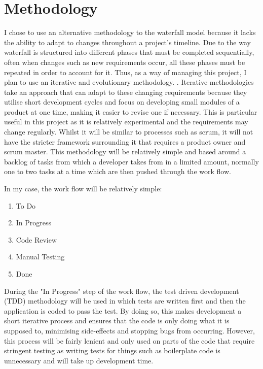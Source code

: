 \documentclass[]{report}
\begin{document}
	\chapter{Methodology}
	I chose to use an alternative methodology to the waterfall model because it lacks the ability to adapt to changes throughout a project's timeline. Due to the way waterfall is structured into different phases that must be completed sequentially, often when changes such as new requirements occur, all these phases must be repeated in order to account for it.	Thus, as a way of managing this project, I plan to use an iterative and evolutionary methodology. . Iterative methodologies take an approach that can adapt to these changing requirements because they utilise short development cycles and focus on developing small modules of a product at one time, making it easier to revise one if necessary. This is particular useful in this project as it is relatively experimental and the requirements may change regularly. Whilst it will be similar to processes such as scrum, it will not have the stricter framework surrounding it that requires a product owner and scrum master. This methodology will be relatively simple and based around a backlog of tasks from which a developer takes from in a limited amount, normally one to two tasks at a time which are then pushed through the work flow.
		
	In my case, the work flow will be relatively simple:
	\begin{enumerate}
		\item To Do
		\item In Progress
		\item Code Review
		\item Manual Testing
		\item Done
	\end{enumerate}
		
	During the "In Progress" step of the work flow, the test driven development (TDD) methodology will be used in which tests are written first and then the application is coded to pass the test. By doing so, this makes development a short iterative process and ensures that the code is only doing what it is supposed to, minimising side-effects and stopping bugs from occurring. However, this process will be fairly lenient and only used  on parts of the code that require stringent testing as writing tests for things such as boilerplate code is unnecessary and will take up development time. 
	
\end{document}
